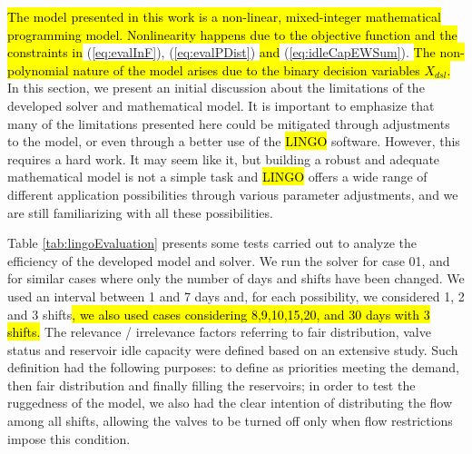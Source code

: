 \documentclass{singlecol}
\theoremstyle{TH}{
\newtheorem{lemma}{Lemma}
\newtheorem{theorem}[lemma]{Theorem}
\newtheorem{corrolary}[lemma]{Corrolary}
\newtheorem{conjecture}[lemma]{Conjecture}
\newtheorem{proposition}[lemma]{Proposition}
\newtheorem{claim}[lemma]{Claim}
\newtheorem{stheorem}[lemma]{Wrong Theorem}
\newtheorem{algorithm}{Algorithm}
}
\theoremstyle{THrm}{
\newtheorem{definition}{Definition}[section]
\newtheorem{question}{Question}[section]
\newtheorem{remark}{Remark}
\newtheorem{scheme}{Scheme}
}
\theoremstyle{THhit}{
\newtheorem{case}{Case}[section]
}
\begin{document}
\label{nonlinerarityExp}{\hl{The model presented in this work is a non-linear, mixed-integer mathematical programming model. Nonlinearity happens due to the objective function and the constraints in}} (\ref{eq:evalInF}), (\ref{eq:evalPDist}) \hl{and} (\ref{eq:idleCapEWSum}). \hl{The non-polynomial nature of the model arises due to the binary decision variables $X_{dsl}$.} In this section, we present an initial discussion about the limitations of the developed solver and mathematical model. It is important to emphasize that many of the limitations presented here could be mitigated through adjustments to the model, or even through a better use of the \hl{LINGO} software. However, this requires a hard work. It may seem like it, but building a robust and adequate mathematical model is not a simple task and \hl{LINGO} offers a wide range of different application possibilities through various parameter adjustments, and we are still familiarizing with all these possibilities. 

Table \ref{tab:lingoEvaluation} presents some tests carried out to analyze the efficiency of the developed model and solver. We run the solver for case 01, and for similar cases where only the number of days and shifts have been changed. We used an interval between 1 and 7 days and, for each possibility, we considered 1, 2 and 3 shifts\hl{, we also used cases considering 8,9,10,15,20, and 30 days with 3 shifts.} The relevance / irrelevance factors referring to fair distribution, valve status and reservoir idle capacity were defined based on an extensive study. Such definition had the following purposes: to define as priorities meeting the demand, then fair distribution and finally filling the reservoirs; in order to test the ruggedness of the model, we also had the clear intention of distributing the flow among all shifts, allowing the valves to be turned off only when flow restrictions impose this condition. 
\end{document}
